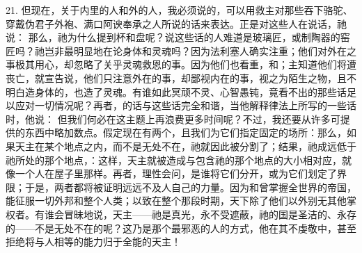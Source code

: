21. 但现在，关于内里的人和外的人，我必须说的，可以用救主对那些吞下骆驼、穿戴伪君子外袍、满口阿谀奉承之人所说的话来表达。正是对这些人在说话，祂说： 那么，祂为什么提到杯和盘呢？说这些话的人难道是玻璃匠，或制陶器的窑匠吗？祂岂非最明显地在论身体和灵魂吗？因为法利塞人确实注重；他们对外在之事极其用心，却忽略了关乎灵魂救恩的事。因为他们也看重，和；主知道他们将遭丧亡，就宣告说，他们只注意外在的事，却鄙视内在的事，视之为陌生之物，且不明白造身体的，也造了灵魂。有谁如此冥顽不灵、心智愚钝，竟看不出的那些话足以应对一切情况呢？再者，的话与这些话完全和谐，当他解释律法上所写的一些话时，他说： 但我们何必在这主题上再浪费更多时间呢？不过，我还要从许多可提供的东西中略加数点。假定现在有两个，且我们为它们指定固定的场所：那么，如果天主在某个地点之内，而不是无处不在，祂就因此被分割了；结果，祂成远低于祂所处的那个地点，：这样，天主就被造成与包含祂的那个地点的大小相对应，就像一个人在屋子里那样。再者，理性会问，是谁将它们分开，或为它们划定了界限；于是，两者都将被证明远远不及人自己的力量。因为和曾掌握全世界的帝国，能征服一切外邦和整个人类；以致在整个那段时期，天下除了他们以外别无其他掌权者。有谁会冒昧地说，天主——祂是真光，永不受遮蔽，祂的国是圣洁的、永存的——不是无处不在的呢？这乃是那个最邪恶的人的方式，他在其不虔敬中，甚至拒绝将与人相等的能力归于全能的天主！\par

